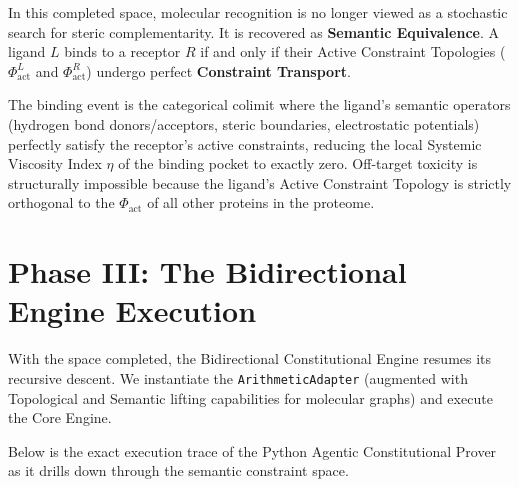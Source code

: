\documentclass[11pt,openany]{extbook}
\theoremstyle{plain}
\theoremstyle{definition}
\begin{document}
In this completed space, molecular recognition is no longer viewed as a stochastic search for steric complementarity. It is recovered as \textbf{Semantic Equivalence}. A ligand $L$ binds to a receptor $R$ if and only if their Active Constraint Topologies ($\Phi_{\text{act}}^L$ and $\Phi_{\text{act}}^R$) undergo perfect \textbf{Constraint Transport}.

The binding event is the categorical colimit where the ligand's semantic operators (hydrogen bond donors/acceptors, steric boundaries, electrostatic potentials) perfectly satisfy the receptor's active constraints, reducing the local Systemic Viscosity Index $\eta$ of the binding pocket to exactly zero. Off-target toxicity is structurally impossible because the ligand's Active Constraint Topology is strictly orthogonal to the $\Phi_{\text{act}}$ of all other proteins in the proteome.

\section{Phase III: The Bidirectional Engine Execution}

With the space completed, the Bidirectional Constitutional Engine resumes its recursive descent. We instantiate the \texttt{ArithmeticAdapter} (augmented with Topological and Semantic lifting capabilities for molecular graphs) and execute the Core Engine.

Below is the exact execution trace of the Python Agentic Constitutional Prover as it drills down through the semantic constraint space.
\end{document}
